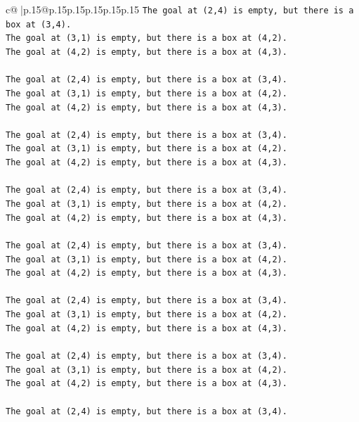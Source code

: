 \documentclass{article}
\begin{document}
{\begin{supertabular}{c@{$\;$}|p{.15\linewidth}@{}p{.15\linewidth}p{.15\linewidth}p{.15\linewidth}p{.15\linewidth}p{.15\linewidth}}
{{{\texttt{The goal at (2,4) is empty, but there is a box at (3,4).} \\
\texttt{The goal at (3,1) is empty, but there is a box at (4,2).} \\
\texttt{The goal at (4,2) is empty, but there is a box at (4,3).} \\
\\ 
\texttt{The goal at (2,4) is empty, but there is a box at (3,4).} \\
\texttt{The goal at (3,1) is empty, but there is a box at (4,2).} \\
\texttt{The goal at (4,2) is empty, but there is a box at (4,3).} \\
\\ 
\texttt{The goal at (2,4) is empty, but there is a box at (3,4).} \\
\texttt{The goal at (3,1) is empty, but there is a box at (4,2).} \\
\texttt{The goal at (4,2) is empty, but there is a box at (4,3).} \\
\\ 
\texttt{The goal at (2,4) is empty, but there is a box at (3,4).} \\
\texttt{The goal at (3,1) is empty, but there is a box at (4,2).} \\
\texttt{The goal at (4,2) is empty, but there is a box at (4,3).} \\
\\ 
\texttt{The goal at (2,4) is empty, but there is a box at (3,4).} \\
\texttt{The goal at (3,1) is empty, but there is a box at (4,2).} \\
\texttt{The goal at (4,2) is empty, but there is a box at (4,3).} \\
\\ 
\texttt{The goal at (2,4) is empty, but there is a box at (3,4).} \\
\texttt{The goal at (3,1) is empty, but there is a box at (4,2).} \\
\texttt{The goal at (4,2) is empty, but there is a box at (4,3).} \\
\\ 
\texttt{The goal at (2,4) is empty, but there is a box at (3,4).} \\
\texttt{The goal at (3,1) is empty, but there is a box at (4,2).} \\
\texttt{The goal at (4,2) is empty, but there is a box at (4,3).} \\
\\ 
\texttt{The goal at (2,4) is empty, but there is a box at (3,4).} \\
}}}
\end{supertabular}}
\end{document}
